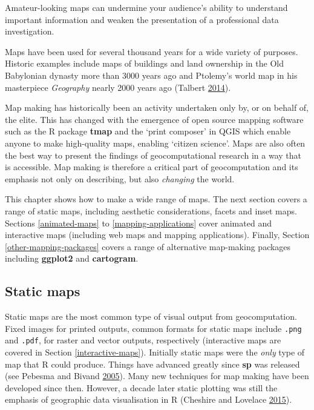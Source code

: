\documentclass[]{krantz}
\renewenvironment{quote}{\begin{VF}}{\end{VF}}
\begin{document}
\begin{quote}
Amateur-looking maps can undermine your audience's ability to understand important information and weaken the presentation of a professional data investigation.
\end{quote}

Maps have been used for several thousand years for a wide variety of purposes.
Historic examples include maps of buildings and land ownership in the Old Babylonian dynasty more than 3000 years ago and Ptolemy's world map in his masterpiece \emph{Geography} nearly 2000 years ago (Talbert \protect\hyperlink{ref-talbert_ancient_2014}{2014}).

Map making has historically been an activity undertaken only by, or on behalf of, the elite.
This has changed with the emergence of open source mapping software such as the R package \textbf{tmap} and the `print composer' in QGIS which enable anyone to make high-quality maps, enabling `citizen science'.
Maps are also often the best way to present the findings of geocomputational research in a way that is accessible.
Map making is therefore a critical part of geocomputation and its emphasis not only on describing, but also \emph{changing} the world.

This chapter shows how to make a wide range of maps.
The next section covers a range of static maps, including aesthetic considerations, facets and inset maps.
Sections \ref{animated-maps} to \ref{mapping-applications} cover animated and interactive maps (including web maps and mapping applications).
Finally, Section \ref{other-mapping-packages} covers a range of alternative map-making packages including \textbf{ggplot2} and \textbf{cartogram}.

\hypertarget{static-maps}{%
\subsection{Static maps}\label{static-maps}}

Static maps are the most common type of visual output from geocomputation.
Fixed images for printed outputs, common formats for static maps include \texttt{.png} and \texttt{.pdf}, for raster and vector outputs, respectively (interactive maps are covered in Section \ref{interactive-maps}).
Initially static maps were the \emph{only} type of map that R could produce.
Things have advanced greatly since \textbf{sp} was released (see Pebesma and Bivand \protect\hyperlink{ref-pebesma_classes_2005}{2005}).
Many new techniques for map making have been developed since then.
However, a decade later static plotting was still the emphasis of geographic data visualisation in R (Cheshire and Lovelace \protect\hyperlink{ref-cheshire_spatial_2015}{2015}).
\end{document}
